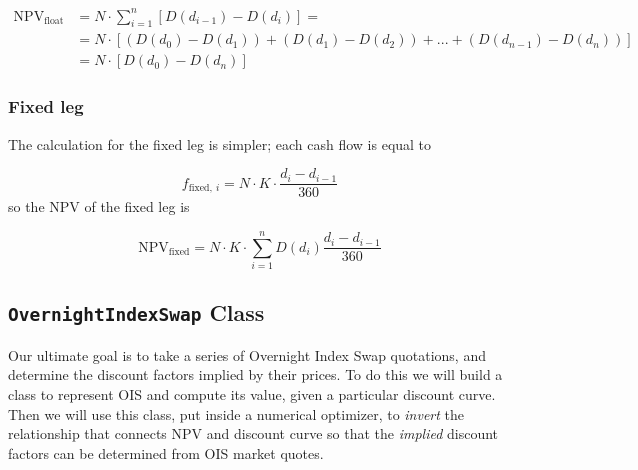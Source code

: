 \begin{equation}
  \begin{split}
    \mathrm{NPV}_{\mathrm{float}} & = N\cdot\sum_{i=1}^{n}[D(d_{i-1}) - D(d_i)] =  \\
    &= N\cdot[(D(d_{0}) - D(d_{1})) + (D(d_{1}) - D(d_{2})) + ... + (D(d_{n-1}) - D(d_{n}))]\\
    &= N \cdot [D(d_0) - D(d_n)]
  \end{split}
\end{equation}

\subsubsection{Fixed leg}\label{fixed-leg}

The calculation for the fixed leg is simpler; each cash flow is equal to

\begin{equation}
f_{\mathrm{fixed},~i}=N\cdot K\cdot \frac{d_i - d_{i-1}}{360}
\end{equation}
so the NPV of the fixed leg is

\begin{equation}
\mathrm{NPV}_{\mathrm{fixed}} = N\cdot K\cdot \sum_{i=1}^{n}D(d_{i})\frac{d_i - d_{i-1}}{360}
\end{equation}

\subsection{\texttt{OvernightIndexSwap} Class}\label{discount-factor-determination-from-market-quotes}

Our ultimate goal is to take a series of Overnight Index Swap
quotations, and determine the discount factors implied by their prices.
To do this we will build a class to represent OIS and compute its value,
given a particular discount curve. Then we will use this class, put inside
a numerical optimizer, to \emph{invert} the relationship that connects 
NPV and discount curve so that the \emph{implied} discount
factors can be determined from OIS market quotes.

